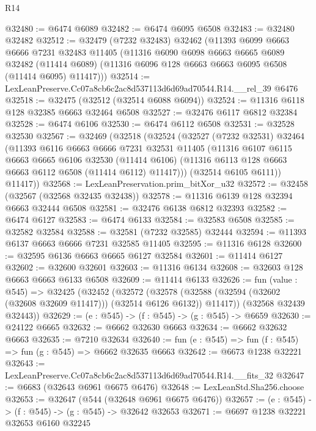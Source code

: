 \begin{lexlean}{R14}
\begin{coremodule}
@32480 := @6474 @6089
@32482 := @6474 @6095 @6508
@32483 := @32480 @32482
@32512 := @32479
    (@7232 @32483)
    @32462
    (@11393
      @6099
      @6663
      @6666
      @7231
      @32483
      @11405
      (@11316
        @6090
        @6098
        @6663
        @6665
        @6089
        @32482
        (@11414 @6089)
        (@11316 @6096 @128 @6663 @6663 @6095 @6508 (@11414 @6095) @11417)))
@32514 := LexLeanPreserve.Cc07a8cb6c2ac8d537113d6d69ad70544.R14.__rel_39 @6476
@32518 := @32475 (@32512 (@32514 @6088 @6094))
@32524 := @11316 @6118 @128 @32385 @6663 @32464 @6508
@32527 := @32476 @6117 @6812 @32384
@32528 := @6474 @6106
@32530 := @6474 @6112 @6508
@32531 := @32528 @32530
@32567 := @32469
    (@32518
      (@32524
        (@32527
          (@7232 @32531)
          @32464
          (@11393
            @6116
            @6663
            @6666
            @7231
            @32531
            @11405
            (@11316
              @6107
              @6115
              @6663
              @6665
              @6106
              @32530
              (@11414 @6106)
              (@11316 @6113 @128 @6663 @6663 @6112 @6508 (@11414 @6112) @11417)))
          (@32514 @6105 @6111))
        @11417))
@32568 := LexLeanPreservation.prim_bitXor_u32
@32572 := @32458 (@32567 (@32568 @32435 @32438))
@32578 := @11316 @6139 @128 @32394 @6663 @32444 @6508
@32581 := @32476 @6138 @6812 @32393
@32582 := @6474 @6127
@32583 := @6474 @6133
@32584 := @32583 @6508
@32585 := @32582 @32584
@32588 := @32581 (@7232 @32585) @32444
@32594 := @11393 @6137 @6663 @6666 @7231 @32585 @11405
@32595 := @11316 @6128
@32600 := @32595 @6136 @6663 @6665 @6127 @32584
@32601 := @11414 @6127
@32602 := @32600 @32601
@32603 := @11316 @6134
@32608 := @32603 @128 @6663 @6663 @6133 @6508
@32609 := @11414 @6133
@32626 := fun (value : @545) =>
  @32425
    (@32452
      (@32572
        (@32578 (@32588 (@32594 (@32602 (@32608 @32609 @11417))) (@32514 @6126 @6132)) @11417))
      (@32568 @32439 @32443))
@32629 := (e : @545) -> (f : @545) -> (g : @545) -> @6659
@32630 := @24122 @6665
@32632 := @6662 @32630 @6663
@32634 := @6662 @32632 @6663
@32635 := @7210 @32634
@32640 := fun (e : @545) => fun (f : @545) => fun (g : @545) => @6662 @32635 @6663
@32642 := @6673 @1238 @32221
@32643 := LexLeanPreserve.Cc07a8cb6c2ac8d537113d6d69ad70544.R14.__fits_32
@32647 := @6683 (@32643 @6961 @6675 @6476)
@32648 := LexLeanStd.Sha256.choose
@32653 := @32647 (@544 (@32648 @6961 @6675 @6476))
@32657 := (e : @545) -> (f : @545) -> (g : @545) -> @32642 @32653
@32671 := @6697
    @1238
    @32221
    @32653
    @6160
    @32245

\end{coremodule}
\end{lexlean}
